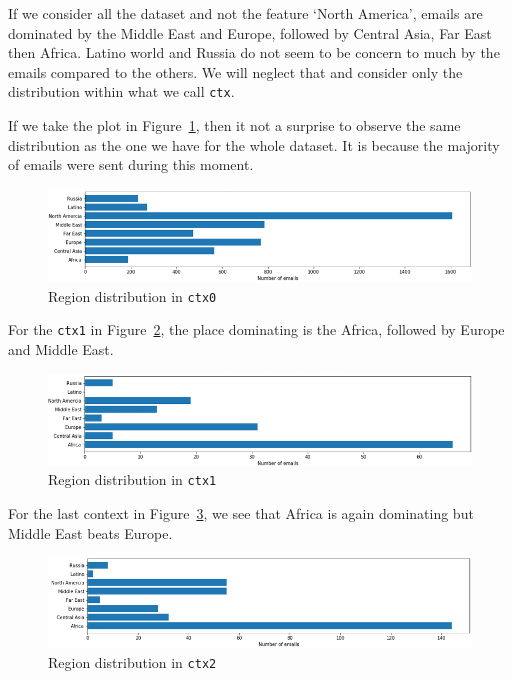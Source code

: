\documentclass[11pt]{article}
\begin{document}
If we consider all the dataset and not the feature `North America', emails are dominated by the Middle East and Europe, followed by Central Asia, Far East then Africa. Latino world and Russia do not seem to be concern to much by the emails compared to the others. We will neglect that and consider only the distribution within what we call \texttt{ctx}. 

If we take the plot in Figure~\ref{fig:emails_map_distribution_ctx0}, then it not a surprise to observe the same distribution as the one we have for the whole dataset. It is because the majority of emails were sent during this moment.

\begin{figure}[h]
	\centering
	\includegraphics[width=\linewidth]{images/emails_map_ctx0.png}
	\caption{Region distribution in \texttt{ctx0}}
	\label{fig:emails_map_distribution_ctx0}
\end{figure}

For the \texttt{ctx1} in Figure~\ref{fig:emails_map_distribution_ctx1}, the place dominating is the Africa, followed by Europe and Middle East.

\begin{figure}[h]
	\centering
	\includegraphics[width=\linewidth]{images/emails_map_ctx1.png}
	\caption{Region distribution in \texttt{ctx1}}
	\label{fig:emails_map_distribution_ctx1}
\end{figure}

For the last context in Figure~\ref{fig:emails_map_distribution_ctx2}, we see that Africa is again dominating but Middle East beats Europe.

\begin{figure}[h]
	\centering
	\includegraphics[width=\linewidth]{images/emails_map_ctx2.png}
	\caption{Region distribution in \texttt{ctx2}}
	\label{fig:emails_map_distribution_ctx2}
\end{figure}
\end{document}
